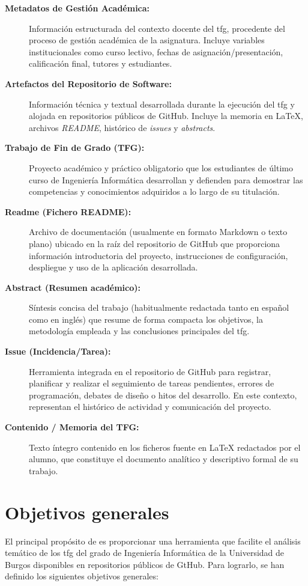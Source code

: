 \begin{description}
	\item[\textbf{Metadatos de Gestión Académica:}] Información estructurada del contexto docente del \acrshort{tfg}, procedente del proceso de gestión académica de la asignatura. Incluye variables institucionales como curso lectivo, fechas de asignación/presentación, calificación final, tutores y estudiantes.
	\item[\textbf{Artefactos del Repositorio de Software:}] Información técnica y textual desarrollada durante la ejecución del \acrshort{tfg} y alojada en repositorios públicos de GitHub. Incluye la memoria en \LaTeX{}, archivos \textit{README}, histórico de \textit{issues} y \textit{abstracts}.
	\item[\textbf{Trabajo de Fin de Grado (TFG):}] Proyecto académico y práctico obligatorio que los estudiantes de último curso de Ingeniería Informática desarrollan y defienden para demostrar las competencias y conocimientos adquiridos a lo largo de su titulación.
	\item[\textbf{Readme (Fichero README):}] Archivo de documentación (usualmente en formato Markdown o texto plano) ubicado en la raíz del repositorio de GitHub que proporciona información introductoria del proyecto, instrucciones de configuración, despliegue y uso de la aplicación desarrollada.
	\item[\textbf{Abstract (Resumen académico):}] Síntesis concisa del trabajo (habitualmente redactada tanto en español como en inglés) que resume de forma compacta los objetivos, la metodología empleada y las conclusiones principales del \Acrshort{tfg}.
	\item[\textbf{Issue (Incidencia/Tarea):}] Herramienta integrada en el repositorio de GitHub para registrar, planificar y realizar el seguimiento de tareas pendientes, errores de programación, debates de diseño o hitos del desarrollo. En este contexto, representan el histórico de actividad y comunicación del proyecto.
	\item[\textbf{Contenido / Memoria del TFG:}] Texto íntegro contenido en los ficheros fuente en \LaTeX{} redactados por el alumno, que constituye el documento analítico y descriptivo formal de su trabajo.
\end{description}

\section{Objetivos generales}
El principal propósito de \nombreProyecto{} es proporcionar una herramienta que
facilite el análisis temático de los \acrshort{tfg} del grado de Ingeniería
Informática de la Universidad de Burgos disponibles en repositorios públicos de
GtHub. Para lograrlo, se han definido los siguientes objetivos generales:

